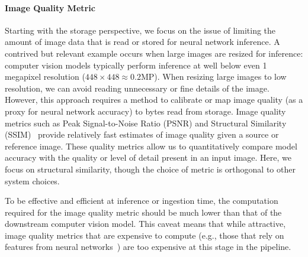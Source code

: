\paragraph{Image Quality Metric}
Starting with the storage perspective, we focus on the issue of limiting the amount of image data that is read or stored for neural network inference.
A contrived but relevant example occurs when large images are resized for inference: computer vision models typically perform inference at well below even 1 megapixel resolution ($448\times448 \approx 0.2 \text{MP}$).
When resizing large images to low resolution, we can avoid reading unnecessary or fine details of the image.
However, this approach requires a method to calibrate or map image quality (as a proxy for neural network accuracy) to bytes read from storage.
Image quality metrics such as Peak Signal-to-Noise Ratio (PSNR) and Structural Similarity (SSIM)~\cite{wang2004image} provide relatively fast estimates of image quality given a source or reference image.
These quality metrics allow us to quantitatively compare model accuracy with the quality or level of detail present in an input image.
Here, we focus on structural similarity, though the choice of metric is orthogonal to other system choices.

To be effective and efficient at inference or ingestion time, the computation required for the image quality metric should be much lower than that of the downstream computer vision model.
This caveat means that while attractive, image quality metrics that are expensive to compute (e.g., those that rely on features from neural networks~\cite{zhang2018unreasonable}) are too expensive at this stage in the pipeline.

